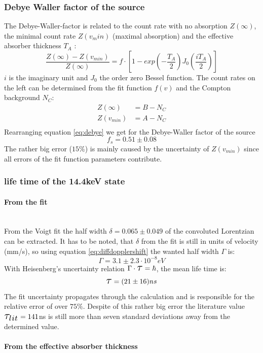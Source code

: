 \subsubsection{Debye Waller factor of the source}
The Debye-Waller-factor is related to the count rate with no absorption $Z(\infty)$, the minimal count rate $Z(v_min)$ (maximal absorption) and the effective absorber thickness $T_A$ \cite{Wegener}:
\begin{equation}
\frac{Z(\infty)-Z(v_{min})}{Z(\infty)}=f\cdot [1-exp(-\frac{T_A}{2})J_0(\frac{iT_A}{2})]
\label{eq:debye}
\end{equation}
$i$ is the imaginary unit and $J_0$ the order zero Bessel function. The count rates on the left can be determined from the fit function $f(v)$ and the Compton background $N_C$:
\begin{equation}
\begin{aligned}
Z(\infty) &= B - N_C\\
Z(v_{min}) &= A-N_C\\
\end{aligned}
\end{equation}
Rearranging equation \ref{eq:debye} we get for the Debye-Waller factor of the source
\begin{equation}
f_s= 0.51\pm0.08
\end{equation}
The rather big error ($15\%$) is mainly caused by the uncertainty of $Z(v_{min})$ since all errors of the fit function parameters contribute.

\subsubsection{life time of the 14.4keV state}
\paragraph{From the fit}\\
From the Voigt fit the half width $\delta = 0.065 \pm 0.049$ of the convoluted Lorentzian can be extracted. It has to be noted, that $\delta$ from the fit is still in units of velocity (mm/s), so using equation \ref{eq:diffdopplershift} the wanted half width $\Gamma$ is:
\begin{equation}
\Gamma  = 3.1\pm2.3\cdot 10^{-8} eV
\end{equation}
With Heisenberg's uncertainty relation $\Gamma \cdot \scalebox{1.5}{$\tau$}=\hbar$, the mean life time is:
\begin{equation}
\scalebox{1.5}{$\tau$}= (21\pm16)ns
\end{equation}
The fit uncertainty propagates through the calculation and is responsible for the 
relative error of over $75\%$. Despite of this rather big error the literature value $\scalebox{1.5}{$\tau_{lit}$}=141$ns is still more than seven standard deviations away from the determined value.

\paragraph{From the effective absorber thickness}


